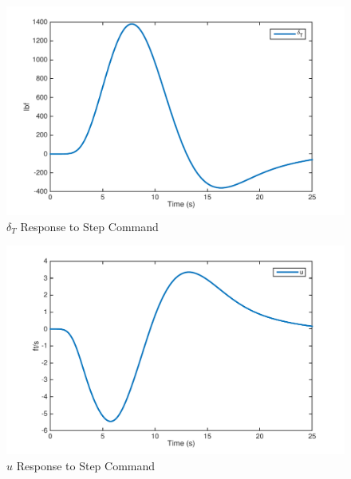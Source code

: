 \documentclass[12pt]{article}
\begin{document}
\begin{figure}[h!]
\begin{center}
\includegraphics[height=.36\textheight]{figures/2_dt}
\caption{$\delta_T$ Response to Step Command}
\end{center}
\end{figure}

\begin{figure}[h!]
\begin{center}
\includegraphics[height=.4\textheight]{figures/2_u}
\caption{$u$ Response to Step Command}
\end{center}
\end{figure}
\end{document}

